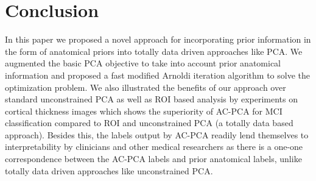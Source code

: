 \documentclass{llncs}
\begin{document}
\section{Conclusion}
In this paper we proposed a novel approach for incorporating prior information in the form of anatomical priors into totally data driven approaches like PCA. We augmented the basic PCA objective to take into account prior anatomical information and proposed a fast modified Arnoldi iteration algorithm to solve the optimization problem. 
We also illustrated the benefits of our approach over standard unconstrained PCA as well as ROI based analysis by experiments on cortical thickness images which shows the superiority of AC-PCA for MCI classification compared to ROI and unconstrained PCA (a totally data based approach).  Besides this, the labels output by AC-PCA readily lend themselves
to interpretability by clinicians and other medical researchers as there is a one-one correspondence between the AC-PCA labels and prior anatomical labels, unlike totally data driven approaches like unconstrained PCA.
\fi



\end{document}
